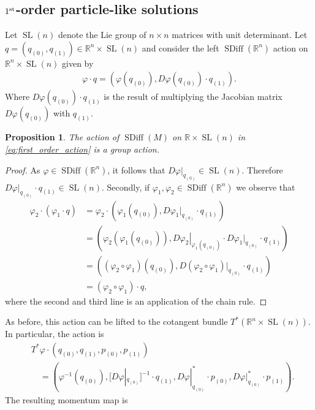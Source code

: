 \documentclass[12pt]{amsart}
\newcommand{\R}{\ensuremath{\mathbb{R}}}
\newtheorem{prop}[thm]{Proposition}
\DeclareMathOperator{\SDiff}{SDiff}
\DeclareMathOperator{\SL}{SL}
\begin{document}
\subsection{$1^{\rm st}$-order particle-like solutions}
\label{sec:first_order}
  Let $\SL(n)$ denote the Lie group of $n\times n$ matrices
  with unit determinant.
  Let $q = (q_{(0)}, q_{(1)}) \in \R^n \times \SL(n)$ and consider the left
  $\SDiff(\R^n)$ action on $\R^n \times \SL(n)$ given by
  \begin{align}
    \varphi \cdot q = (\varphi(q_{(0)} ) , D\varphi(q_{(0)} ) \cdot q_{(1)} ). \label{eq:first_order_action}
  \end{align}
  Where $D\varphi(q_{(0)} ) \cdot q_{(1)}$ is the result of multiplying
  the Jacobian matrix $D\varphi(q_{(0)} )$ with $q_{(1)}$.
  \begin{prop}
    The action of $\SDiff(M)$ on $\R \times \SL(n)$ in \eqref{eq:first_order_action} is a group action.
  \end{prop}
  \begin{proof}
    As $\varphi \in \SDiff(\R^n)$, it follows that $D\varphi |_{q_{(0)}} \in \SL(n)$.    Therefore $D\varphi |_{q_{(0)}} \cdot q_{(1)} \in \SL(n)$.
    Secondly, if $\varphi_1,\varphi_2 \in \SDiff(\R^n)$ we observe that
    \begin{align*}
      \varphi_2 \cdot (\varphi_1 \cdot q) &= \varphi_2 \cdot (\varphi_1(q_{(0)} ) , D\varphi_1 |_{q_{(0)}} \cdot q_{(1)} ) \\
      &= (\varphi_2(\varphi_1(q_{(0)} )) , \left. D\varphi_2 \right|_{\varphi_1( q_{(0)} )} \cdot D\varphi_1 |_{ q_{(0)} } \cdot q_{(1)} ) \\
      &= ( (\varphi_2 \circ \varphi_1)(q_{(0)} ) , D( \varphi_2 \circ \varphi_1)|_{q_{(0)} } \cdot q_{(1)} ) \\
      &= (\varphi_2 \circ \varphi_1) \cdot q,
    \end{align*}
    where the second and third line is an application of the chain rule.
  \end{proof}
  As before, this action can be lifted to the cotangent bundle $T^*(\R^n \times \SL(n))$.  In particular, 
  the action is
  \begin{align*}
    &T^*\varphi \cdot ( q_{(0)} , q_{(1)}  , p_{(0)} , p_{(1)} ) \\
    &\quad = ( \varphi^{-1}(q_{(0)})  , [D\varphi|_{q_{(0)}}]^{-1} \cdot q_{(1)} , D\varphi|_{q_{(0)}}^* \cdot p_{(0)} , D\varphi|_{q_{(0)}}^* \cdot p_{(1)} ).
  \end{align*}
  The resulting momentum map is
\end{document}
